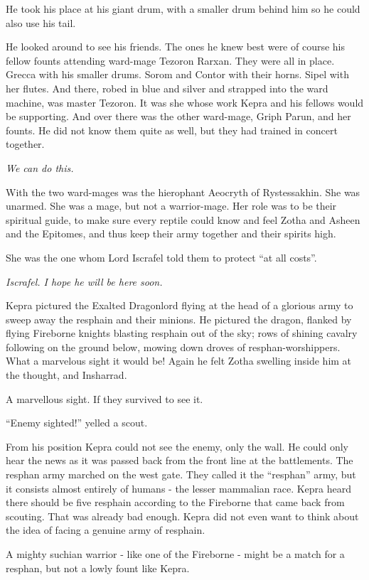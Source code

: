 \documentclass
  [a4paper,
   12pt,
   oneside
  ]%
  {article}
\newcommand{\sectionbreak}{\bigskip\noindent}
\begin{document}
He took his place at his giant drum, with a smaller drum behind him so he could also use his tail. 

He looked around to see his friends. 
The ones he knew best were of course his fellow founts attending ward-mage Tezoron Rarxan. 
They were all in place. Grecca with his smaller drums. Sorom and Contor with their horns. Sipel with her flutes. 
And there, robed in blue and silver and strapped into the ward machine, was master Tezoron. 
It was she whose work Kepra and his fellows would be supporting. And over there was the other ward-mage, Griph Parun, and her founts. He did not know them quite as well, but they had trained in concert together. 

\emph{We can do this.}

With the two ward-mages was the hierophant Aeocryth of Rystessakhin.
She was unarmed. She was a mage, but not a warrior-mage. 
Her role was to be their spiritual guide, to make sure every reptile could know and feel Zotha and Asheen and the Epitomes, and thus keep their army together and their spirits high.

She was the one whom Lord Iscrafel told them to protect ``at all costs''.

\emph{Iscrafel. I hope he will be here soon.} 

Kepra pictured the Exalted Dragonlord flying at the head of a glorious army to sweep away the resphain and their minions. He pictured the dragon, flanked by flying Fireborne knights blasting resphain out of the sky; rows of shining cavalry following on the ground below, mowing down droves of resphan-worshippers. 
What a marvelous sight it would be! Again he felt Zotha swelling inside him at the thought, and Insharrad. 

A marvellous sight. If they survived to see it.

\sectionbreak
``Enemy sighted!'' yelled a scout.

From his position Kepra could not see the enemy, only the wall. He could only hear the news as it was passed back from the front line at the battlements. 
The resphan army marched on the west gate. 
They called it the ``resphan'' army, but it consists almost entirely of humans - the lesser mammalian race. Kepra heard there should be five resphain according to the Fireborne that came back from scouting. That was already bad enough. Kepra did not even want to think about the idea of facing a genuine army of resphain. 

A mighty suchian warrior - like one of the Fireborne - might be a match for a resphan, but not a lowly fount like Kepra. 
\end{document}
